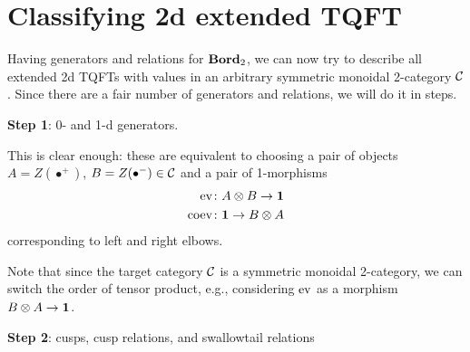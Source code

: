 \section{Classifying 2d extended TQFT}\label{s:2d-xtqft-classification}

Having generators and relations for $\mathbf{Bord}_2$, we can now try to describe
all extended 2d TQFTs with values in an arbitrary symmetric monoidal 2-category
$\mathcal{C}$. Since there are a fair number of generators and relations, we will do
it in steps.



\textbf{Step 1}: 0- and 1-d generators.

This is clear enough: these are equivalent to choosing a pair of objects
$A=Z(\bullet^+)$, $B=Z(\bullet^-) \in \mathcal{C}$ and a pair of 1-morphisms
$$
\begin{aligned}
  \operatorname{ev} & \colon A\otimes B\to \mathbf{1}\\
  \operatorname{coev} &\colon \mathbf{1} \to B\otimes A
\end{aligned}
$$
corresponding to left and right elbows.

Note that since the target category $\mathcal{C}$ is a symmetric monoidal 2-category,
we can switch the order of tensor product, e.g., considering $\operatorname{ev}$ as a morphism
$B\otimes A\to \mathbf{1}$.

\textbf{Step 2}: cusps, cusp relations, and swallowtail relations

